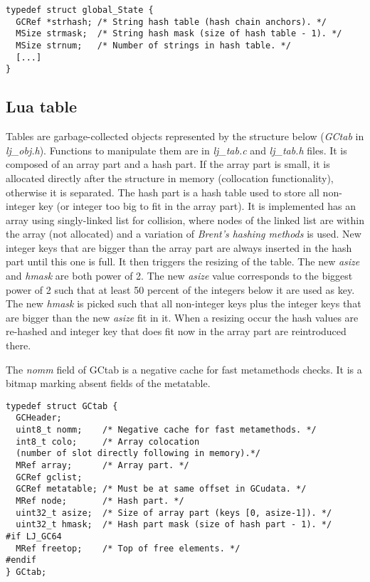 \begin{lstlisting}[style=CStyle]
typedef struct global_State {
  GCRef *strhash; /* String hash table (hash chain anchors). */
  MSize strmask;  /* String hash mask (size of hash table - 1). */
  MSize strnum;   /* Number of strings in hash table. */
  [...]
}
\end{lstlisting}


\subsection{Lua table}
\label{Subsec:table}

Tables are garbage-collected objects represented by the structure below
(\emph{GCtab} in \emph{lj\_obj.h}). Functions to manipulate them are in
\emph{lj\_tab.c} and \emph{lj\_tab.h} files. It is composed of an array part and
a hash part. If the array part is small, it is allocated directly after the
structure in memory (collocation functionality), otherwise it is separated. The
hash part is a hash table used to store all non-integer key (or integer too big
to fit in the array part). It is implemented has an array using singly-linked
list for collision, where nodes of the linked list are within the array (not
allocated) and a variation of \emph{Brent's hashing methods} is used.
New integer keys that are bigger than the array part are always inserted
in the hash part until this one is full. It then triggers the resizing of the
table. The new \emph{asize} and \emph{hmask} are both power of 2. The
new \emph{asize} value corresponds to the biggest power of 2 such that at least
50 percent of the integers below it are used as key. The new \emph{hmask} is
picked such that all non-integer keys plus the integer keys that are bigger than
the new \emph{asize} fit in it. When a resizing occur the hash values are
re-hashed and integer key that does fit now in the array part are reintroduced
there.

The \emph{nomm} field of GCtab is a
negative cache for fast metamethods checks. It is a bitmap marking absent fields
of the metatable.

\begin{lstlisting}[style=CStyle]
typedef struct GCtab {
  GCHeader;
  uint8_t nomm;    /* Negative cache for fast metamethods. */
  int8_t colo;     /* Array colocation
  (number of slot directly following in memory).*/
  MRef array;      /* Array part. */
  GCRef gclist;
  GCRef metatable; /* Must be at same offset in GCudata. */
  MRef node;       /* Hash part. */
  uint32_t asize;  /* Size of array part (keys [0, asize-1]). */
  uint32_t hmask;  /* Hash part mask (size of hash part - 1). */
#if LJ_GC64
  MRef freetop;    /* Top of free elements. */
#endif
} GCtab;
\end{lstlisting}

